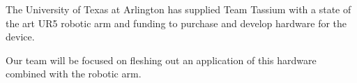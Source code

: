The University of Texas at Arlington has supplied Team Tassium with a state of the art UR5 robotic arm and funding to purchase and develop hardware for the device.

Our team will be focused on fleshing out an application of this hardware combined with the robotic arm.